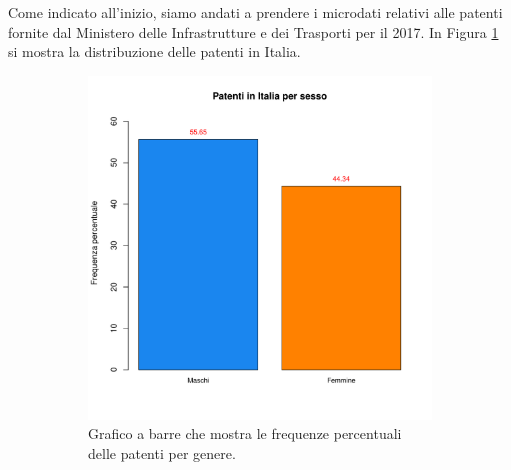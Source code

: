 \documentclass[12pt,a4paper,final,oneside]{article}			%
\begin{document}
        Come indicato all'inizio, siamo andati a prendere i microdati relativi alle patenti fornite dal Ministero delle Infrastrutture e dei Trasporti per il 2017. In Figura \ref{Fig: tot_patenti} si mostra la distribuzione delle patenti in Italia.
        \begin{figure}[h]
        \centering
            \begin{subfigure}{0.5\textwidth}
                
                \includegraphics[scale=0.5]{../results/patenti_per_sesso.pdf}
                \caption{Grafico a barre che mostra le frequenze percentuali delle patenti per genere.}
                \label{Fig: tot_patenti}
            \end{subfigure}
            
            \begin{subfigure}{0.5\textwidth}
                

\end{subfigure}
\end{figure}
\end{document}
